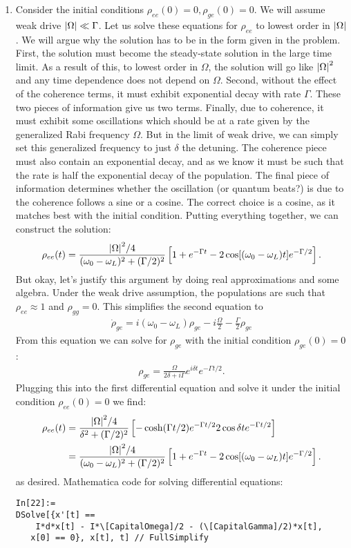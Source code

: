 \documentclass{article}
\theoremstyle{definition}
\newcommand{\f}[2]{\frac{#1}{#2}}
\newcommand{\lb}{\left[}
\newcommand{\rb}{\right]}
\begin{document}
\begin{enumerate}[label=(\alph*)]

\item Consider the initial conditions $\rho_{ee}(0) = 0, \rho_{ge}(0) = 0$. We will assume weak drive $\abs{\Omega} \ll \Gamma$. Let us solve these equations for $\rho_{ee}$ to lowest order in $\abs{\Omega}$. We will argue why the solution has to be in the form given in the problem. First, the solution must become the steady-state solution in the large time limit. As a result of this, to lowest order in $\Omega$, the solution will go like $\abs{\Omega}^2$ and any time dependence does not depend on $\Omega$.  Second, without the effect of the coherence terms, it must exhibit exponential decay with rate $\Gamma$. These two pieces of information give us two terms. Finally, due to coherence, it must exhibit some oscillations which should be at a rate given by the generalized Rabi frequency $\Omega$. But in the limit of weak drive, we can simply set this generalized frequency to just $\delta$ the detuning. The coherence piece must also contain an exponential decay, and as we know it must be such that the rate is half the exponential decay of the population. The final piece of information determines whether the oscillation (or quantum beats?) is due to the coherence follows a sine or a cosine. The correct choice is a cosine, as it matches best with the initial condition. Putting everything together, we can construct the solution:
\begin{align*}
\rho_{ee}(t) = \f{\abs{\Omega}^2/4}{(\omega_0 - \omega_L)^2 + (\Gamma/2)^2} \lb 1 + e^{-\Gamma t} -2 \cos [(\omega_0 - \omega_L)t] e^{-\Gamma/2} \rb.
\end{align*}
But okay, let's justify this argument by doing real approximations and some algebra. Under the weak drive assumption, the populations are such that $\rho_{ee} \approx 1$ and $\rho_{gg} = 0$. This simplifies the second equation to 
\begin{align*}
\dot{\rho}_{ge} = i (\omega_0 - \omega_L) \rho_{ge} - i \f{\Omega}{2} - \f{\Gamma}{2} \rho_{ge}
\end{align*}
From this equation we can solve for $\rho_{ge}$ with the initial condition $\rho_{ge}(0) = 0$:
\begin{align*}
\rho_{ge} =  \f{{\Omega}}{2\delta + i\Gamma} e^{i \delta t } e^{-\Gamma t /2}. 
\end{align*}
Plugging this into the first differential equation and solve it under the initial condition $\rho_{ee}(0) = 0$ we find:
\begin{align*}
\rho_{ee}(t) 
&= \f{\abs{\Omega}^2 /4 }{\delta^2 + (\Gamma/2)^2} \lb -\cosh (\Gamma t / 2) e^{- \Gamma t /2}  2 \cos \delta t e^{-\Gamma t / 2} \rb \\
&=  \f{\abs{\Omega}^2/4}{(\omega_0 - \omega_L)^2 + (\Gamma/2)^2} \lb 1 + e^{-\Gamma t} -2 \cos [(\omega_0 - \omega_L)t] e^{-\Gamma/2} \rb.
\end{align*}
as desired. Mathematica code for solving differential equations:
\begin{lstlisting}
In[22]:= 
DSolve[{x'[t] == 
    I*d*x[t] - I*\[CapitalOmega]/2 - (\[CapitalGamma]/2)*x[t], 
   x[0] == 0}, x[t], t] // FullSimplify


\end{lstlisting}
\end{enumerate}
\end{document}
